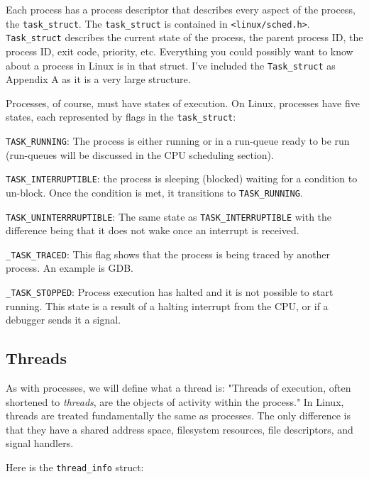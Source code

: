 \documentclass[10pt,letterpaper,onecolumn,draftclsnofoot]{IEEEtran}
\begin{document}
Each process has a process descriptor that describes every aspect of
the process, the \texttt{task\_struct}. The \texttt{task\_struct} is contained
in \texttt{<linux/sched.h>}. \texttt{Task\_struct} describes the current state
of the process, the parent process ID, the process ID, exit code, priority, etc.
Everything you could possibly want to know about a process in Linux is in that
struct. I've included the \texttt{Task\_struct} as Appendix A as it is a very
large structure.

Processes, of course, must have states of execution. On Linux, processes have
five states, each represented by flags in the \texttt{task\_struct}:

\begin{description}
  \item \texttt{TASK\_RUNNING}: The process is either running or in a run-queue
  ready to be run (run-queues will be discussed in the CPU scheduling section).
  \item \texttt{TASK\_INTERRUPTIBLE}: the process is sleeping (blocked) waiting
  for a condition to un-block. Once the condition is met, it transitions to
  \texttt{TASK\_RUNNING}.
  \item \texttt{TASK\_UNINTERRRUPTIBLE}: The same state as \texttt{TASK\_INTERRUPTIBLE}
  with the difference being that it does not wake once an interrupt is received.
  \item \texttt{\_TASK\_TRACED}: This flag shows that the process is being traced
  by another process. An example is GDB.
  \item \texttt{\_TASK\_STOPPED}: Process execution has halted and it is not
  possible to start running. This state is a result of a halting interrupt from
  the CPU, or if a debugger sends it a signal.
\end{description}

  \subsection{Threads}
As with processes, we will define what a thread is: "Threads of execution, often
shortened to \textit{threads}, are the objects of activity within the process."
\cite{robertlove2010} In Linux, threads are treated fundamentally the same as
processes. The only difference is that they have a shared address space,
filesystem resources, file descriptors, and signal handlers.

Here is the \texttt{thread\_info} struct:\cite{robertlove2010}
\end{document}
